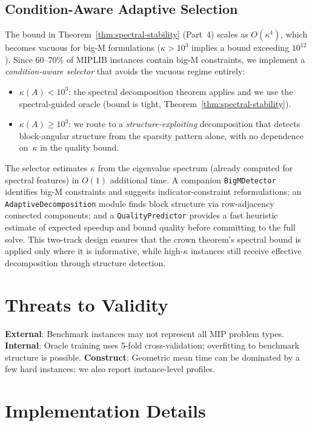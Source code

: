 \documentclass[11pt]{article}
\begin{document}
\subsection{Condition-Aware Adaptive Selection}
\label{sec:condition-aware}

The bound in Theorem~\ref{thm:spectral-stability} (Part~4) scales as
$O(\kappa^4)$, which becomes vacuous for big-M formulations ($\kappa > 10^3$
implies a bound exceeding $10^{12}$).  Since 60--70\% of MIPLIB instances
contain big-M constraints, we implement a \emph{condition-aware selector}
that avoids the vacuous regime entirely:
\begin{itemize}[leftmargin=*]
\item $\kappa(A) < 10^3$: the spectral decomposition theorem applies and we
  use the spectral-guided oracle (bound is tight, Theorem~\ref{thm:spectral-stability}).
\item $\kappa(A) \geq 10^3$: we route to a \emph{structure-exploiting}
  decomposition that detects block-angular structure from the sparsity pattern
  alone, with no dependence on~$\kappa$ in the quality bound.
\end{itemize}
The selector estimates $\kappa$ from the eigenvalue spectrum (already computed
for spectral features) in $O(1)$ additional time.  A companion
\texttt{BigMDetector} identifies big-M constraints and suggests indicator-constraint
reformulations; an \texttt{AdaptiveDecomposition} module finds block structure
via row-adjacency connected components; and a \texttt{QualityPredictor}
provides a fast heuristic estimate of expected speedup and bound quality
before committing to the full solve.
This two-track design ensures that the crown theorem's spectral bound is
applied only where it is informative, while high-$\kappa$ instances still
receive effective decomposition through structure detection.


\section{Threats to Validity}

\textbf{External}: Benchmark instances may not represent all MIP problem types. \textbf{Internal}: Oracle training uses 5-fold cross-validation; overfitting to benchmark structure is possible. \textbf{Construct}: Geometric mean time can be dominated by a few hard instances; we also report instance-level profiles.


\section{Implementation Details}
\label{sec:impl}
\end{document}
